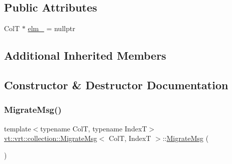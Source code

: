 \subsection*{Public Attributes}
\begin{DoxyCompactItemize}
\item 
ColT $\ast$ \hyperlink{structvt_1_1vrt_1_1collection_1_1_migrate_msg_aa074fd362c469f1a0aae30d1cf9888bf}{elm\+\_\+} = nullptr
\end{DoxyCompactItemize}
\subsection*{Additional Inherited Members}


\subsection{Constructor \& Destructor Documentation}
\mbox{\label{structvt_1_1vrt_1_1collection_1_1_migrate_msg_a0b41c5d241e067dadb4648653f9909bc}} 
\subsubsection{\texorpdfstring{Migrate\+Msg()}{MigrateMsg()}\hspace{0.1cm}{\footnotesize\ttfamily [1/2]}}
{\footnotesize\ttfamily template$<$typename ColT, typename IndexT$>$ \\
\hyperlink{structvt_1_1vrt_1_1collection_1_1_migrate_msg}{vt\+::vrt\+::collection\+::\+Migrate\+Msg}$<$ ColT, IndexT $>$\+::\hyperlink{structvt_1_1vrt_1_1collection_1_1_migrate_msg}{Migrate\+Msg} (\begin{DoxyParamCaption}{ }\end{DoxyParamCaption})\hspace{0.3cm}{\ttfamily [default]}}

\mbox{\label{structvt_1_1vrt_1_1collection_1_1_migrate_msg_a900313445de89550eca07334a2ca21ba}} 
